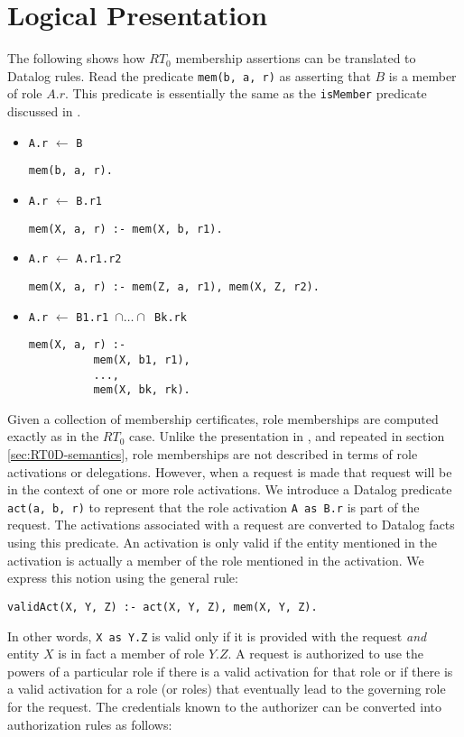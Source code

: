 \documentclass{article}
\newcommand{\predicate}[1]{\texttt{#1}}
\newcommand{\memcert}[2]{\texttt{#1} $\leftarrow$ \texttt{#2}}
\newcommand{\activate}[2]{\texttt{#1 as #2}}
\begin{document}
\section{Logical Presentation}

The following shows how $RT_0$ membership assertions can be translated to Datalog rules. Read
the predicate \predicate{mem(b, a, r)} as asserting that $B$ is a member of role $A.r$. This
predicate is essentially the same as the \predicate{isMember} predicate discussed in
\cite{Li:2002-05}.

\begin{itemize}

\item \memcert{A.r}{B}

\texttt{mem(b, a, r).}

\item \memcert{A.r}{B.r1}

\texttt{mem(X, a, r) :- mem(X, b, r1).}

\item \memcert{A.r}{A.r1.r2}

\texttt{mem(X, a, r) :- mem(Z, a, r1), mem(X, Z, r2).}

\item \memcert{A.r}{B1.r1 $\cap \ldots \cap$ Bk.rk}
\begin{verbatim}
mem(X, a, r) :-
          mem(X, b1, r1),
          ...,
          mem(X, bk, rk).
\end{verbatim}

\end{itemize}

Given a collection of membership certificates, role memberships are computed exactly as in the
$RT_0$ case. Unlike the presentation in \cite{Li:2002-05}, and repeated in section
\ref{sec:RT0D-semantics}, role memberships are not described in terms of role activations or
delegations. However, when a request is made that request will be in the context of one or more
role activations. We introduce a Datalog predicate \predicate{act(a, b, r)} to represent that
the role activation \activate{A}{B.r} is part of the request. The activations associated with a
request are converted to Datalog facts using this predicate. An activation is only valid if the
entity mentioned in the activation is actually a member of the role mentioned in the activation.
We express this notion using the general rule:

\texttt{validAct(X, Y, Z) :- act(X, Y, Z), mem(X, Y, Z).}

In other words, \activate{X}{Y.Z} is valid only if it is provided with the request \emph{and}
entity $X$ is in fact a member of role $Y.Z$. A request is authorized to use the powers of a
particular role if there is a valid activation for that role or if there is a valid activation
for a role (or roles) that eventually lead to the governing role for the request. The
credentials known to the authorizer can be converted into authorization rules as follows:
\end{document}
